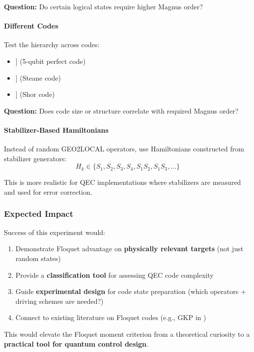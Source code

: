 \textbf{Question:} Do certain logical states require higher Magnus order?

\paragraph{Different Codes}

Test the hierarchy across codes:
\begin{itemize}
\item [[5,1,3]] (5-qubit perfect code)
\item [[7,1,3]] (Steane code)
\item [[9,1,3]] (Shor code)
\end{itemize}

\textbf{Question:} Does code size or structure correlate with required Magnus order?

\paragraph{Stabilizer-Based Hamiltonians}

Instead of random GEO2LOCAL operators, use Hamiltonians constructed from stabilizer generators:
\begin{equation}
H_k \in \{ S_1, S_2, S_3, S_4, S_1 S_2, S_1 S_3, \ldots \}
\end{equation}

This is more realistic for QEC implementations where stabilizers are measured and used for error correction.

\subsubsection{Expected Impact}

Success of this experiment would:
\begin{enumerate}
\item Demonstrate Floquet advantage on \textbf{physically relevant targets} (not just random states)
\item Provide a \textbf{classification tool} for assessing QEC code complexity
\item Guide \textbf{experimental design} for code state preparation (which operators + driving schemes are needed?)
\item Connect to existing literature on Floquet codes (e.g., GKP in \cite{Kolesnikow_2024})
\end{enumerate}

This would elevate the Floquet moment criterion from a theoretical curiosity to a \textbf{practical tool for quantum control design}.
